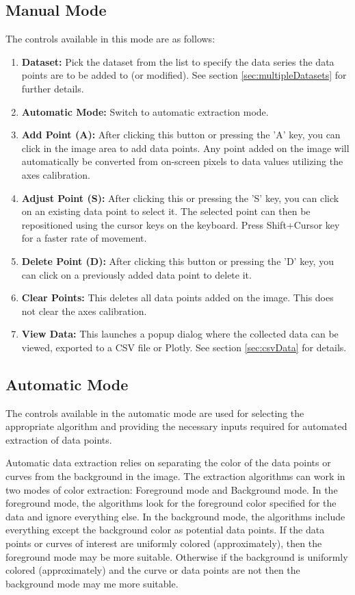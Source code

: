 \documentclass[letterpaper, 10pt]{article}
\begin{document}
\subsection{Manual Mode}
The controls available in this mode are as follows:
\begin{enumerate}
\item{{\bf Dataset: }Pick the dataset from the list to specify the data series the data points are to be added to (or modified). See section \ref{sec:multipleDatasets} for further details.}
\item{{\bf Automatic Mode: }Switch to automatic extraction mode.}
\item{{\bf Add Point (A): }After clicking this button or pressing the 'A' key, you can click in the image area to add data points. Any point added on the image will automatically be converted from on-screen pixels to data values utilizing the axes calibration.}
\item{{\bf Adjust Point (S): }After clicking this or pressing the 'S' key, you can click on an existing data point to select it. The selected point can then be repositioned using the cursor keys on the keyboard. Press Shift+Cursor key for a faster rate of movement.}
\item{{\bf Delete Point (D): }After clicking this button or pressing the 'D' key, you can click on a previously added data point to delete it.}
\item{{\bf Clear Points: }This deletes all data points added on the image. This does not clear the axes calibration.}
\item{{\bf View Data: }This launches a popup dialog where the collected data can be viewed, exported to a CSV file or Plotly. See section \ref{sec:csvData} for details.}
\end{enumerate}

\subsection{Automatic Mode}
The controls available in the automatic mode are used for selecting the appropriate algorithm and providing the necessary inputs required for automated extraction of data points. 

Automatic data extraction relies on separating the color of the data points or curves from the background in the image. The extraction algorithms can work in two modes of color extraction: Foreground mode and Background mode. In the foreground mode, the algorithms look for the foreground color specified for the data and ignore everything else. In the background mode, the algorithms include everything except the background color as potential data points. If the data points or curves of interest are uniformly colored (approximately), then the foreground mode may be more suitable. Otherwise if the background is uniformly colored (approximately) and the curve or data points are not then the background mode may me more suitable.
\end{document}
